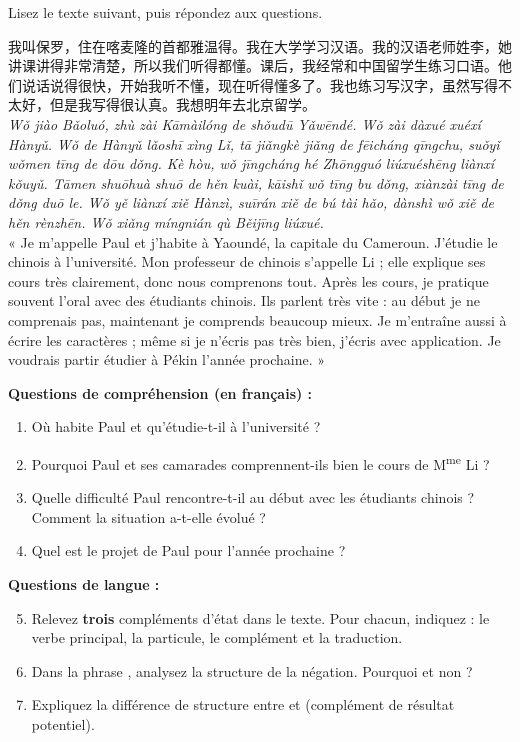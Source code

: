 \documentclass[11pt]{article}
\newcommand{\zh}[1]{\ifmmode\text{#1}\else{#1}\fi}
\begin{document}
\begin{exercice}
Lisez le texte suivant, puis répondez aux questions.

\begin{textebox}
我叫保罗，住在喀麦隆的首都雅温得。我在大学学习汉语。我的汉语老师姓李，她讲课讲得非常清楚，所以我们听得都懂。课后，我经常和中国留学生练习口语。他们说话说得很快，开始我听不懂，现在听得懂多了。我也练习写汉字，虽然写得不太好，但是我写得很认真。我想明年去北京留学。\\
\emph{Wǒ jiào Bǎoluó, zhù zài Kāmàilóng de shǒudū Yǎwēndé. Wǒ zài dàxué xuéxí Hànyǔ. Wǒ de Hànyǔ lǎoshī xìng Lǐ, tā jiǎngkè jiǎng de fēicháng qīngchu, suǒyǐ wǒmen tīng de dōu dǒng. Kè hòu, wǒ jīngcháng hé Zhōngguó liúxuéshēng liànxí kǒuyǔ. Tāmen shuōhuà shuō de hěn kuài, kāishǐ wǒ tīng bu dǒng, xiànzài tīng de dǒng duō le. Wǒ yě liànxí xiě Hànzì, suīrán xiě de bú tài hǎo, dànshì wǒ xiě de hěn rènzhēn. Wǒ xiǎng míngnián qù Běijīng liúxué.}\\
« Je m'appelle Paul et j'habite à Yaoundé, la capitale du Cameroun. J'étudie le chinois à l'université. Mon professeur de chinois s'appelle Li ; elle explique ses cours très clairement, donc nous comprenons tout. Après les cours, je pratique souvent l'oral avec des étudiants chinois. Ils parlent très vite : au début je ne comprenais pas, maintenant je comprends beaucoup mieux. Je m'entraîne aussi à écrire les caractères ; même si je n'écris pas très bien, j'écris avec application. Je voudrais partir étudier à Pékin l'année prochaine. »
\end{textebox}

\textbf{Questions de compréhension (en français) :}
\begin{enumerate}
\item Où habite Paul et qu'étudie-t-il à l'université ?
\item Pourquoi Paul et ses camarades comprennent-ils bien le cours de M\textsuperscript{me} Li ?
\item Quelle difficulté Paul rencontre-t-il au début avec les étudiants chinois ? Comment la situation a-t-elle évolué ?
\item Quel est le projet de Paul pour l'année prochaine ?
\end{enumerate}

\textbf{Questions de langue :}
\begin{enumerate}
\setcounter{enumi}{4}
\item Relevez \textbf{trois} compléments d'état dans le texte. Pour chacun, indiquez : le verbe principal, la particule, le complément et la traduction.
\item Dans la phrase \zh{写得不太好}, analysez la structure de la négation. Pourquoi \zh{不} et non \zh{没} ?
\item Expliquez la différence de structure entre \zh{讲课讲得清楚} et \zh{听得懂} (complément de résultat potentiel).
\end{enumerate}
\end{exercice}
\end{document}
